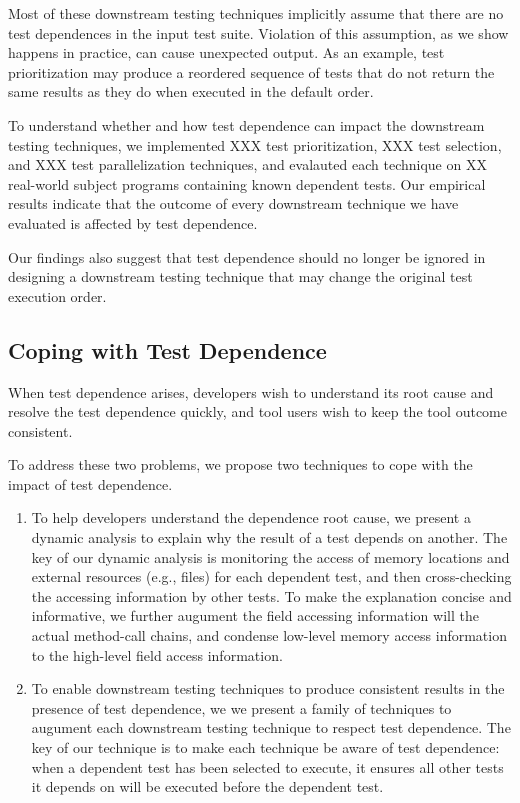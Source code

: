 Most of these downstream testing techniques implicitly
assume that there are no test dependences in the input test
suite. Violation of this assumption, as we show happens in
practice, can cause unexpected output. As an example, test
prioritization may produce a reordered sequence of tests that
do not return the same results as they do when executed in
the default order.

To understand whether and how test dependence can impact
the downstream testing techniques, we implemented XXX
test prioritization, XXX test selection, and XXX test parallelization
techniques, and evalauted each technique
on XX real-world subject programs containing known dependent tests.
Our empirical results indicate that the outcome of
every downstream technique we have evaluated is affected by 
test dependence. 

Our findings also suggest that test dependence should no longer
be ignored in designing a downstream testing technique that
may change the original test execution order.




\subsection{Coping with Test Dependence}

When test dependence arises, developers wish to understand
its root cause and resolve the test dependence quickly, and
tool users wish to keep the tool outcome consistent.

To address these two problems, we propose two techniques to
cope with the impact of test dependence.

\begin{enumerate}
\item To help developers understand the dependence root cause,
we present a dynamic analysis to explain why the result of
a test depends on another. The key of our dynamic analysis
is monitoring the access of memory locations and external
resources (e.g., files) for each dependent test, and then
cross-checking the accessing information by other tests.
To make the explanation concise and informative, we further
augument the field accessing information will the actual
method-call chains, and condense low-level memory access
information to the high-level field access information.

\item To enable downstream testing techniques to produce
consistent results in the presence of test dependence, we
we present a family of techniques to augument each downstream
testing technique to respect test dependence. The key of
our technique is to make each technique be aware of test dependence:
when a dependent test has been selected to execute, it ensures
all other tests it depends on will be executed before the
dependent test.

\end{enumerate}


